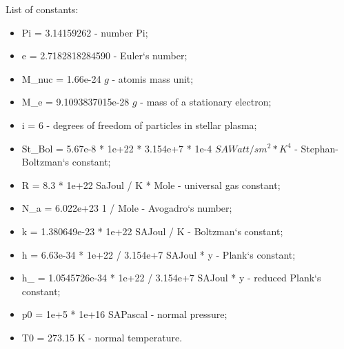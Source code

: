 \documentclass[a4paper,12pt]{article}
\begin{document}
\vspace{1em}

List of constants:

\begin{itemize}

    \item Pi = 3.14159262 - number Pi;\\
    
    \item e = 2.7182818284590 - Euler`s number;\\
    
    \item M\_nuc = 1.66e-24 $g$ - atomis mass unit;\\
    
    \item M\_e = 9.1093837015e-28 $g$ - mass of a stationary electron;\\
    
    \item i = 6 - degrees of freedom of particles in stellar plasma;\\
    
    \item St\_Bol = 5.67e-8 * 1e+22 * 3.154e+7 * 1e-4 $SAWatt / sm^{2} * K^{4}$ - Stephan-Boltzman`s constant;\\
    
    \item R = 8.3 * 1e+22 SaJoul / K * Mole - universal gas constant;\\
    
    \item N\_a = 6.022e+23 1 / Mole - Avogadro`s number;\\
    
    \item k = 1.380649e-23 * 1e+22 SAJoul / K - Boltzman`s constant;\\
    
    \item h = 6.63e-34 * 1e+22 / 3.154e+7 SAJoul * y - Plank`s constant;\\
    
    \item h\_ = 1.0545726e-34 * 1e+22 / 3.154e+7 SAJoul * y - reduced Plank`s constant;\\
    
    \item p0 = 1e+5 * 1e+16 SAPascal - normal pressure;\\
    
    \item T0 = 273.15 K - normal temperature.\\
    
\end{itemize}
\end{document}
